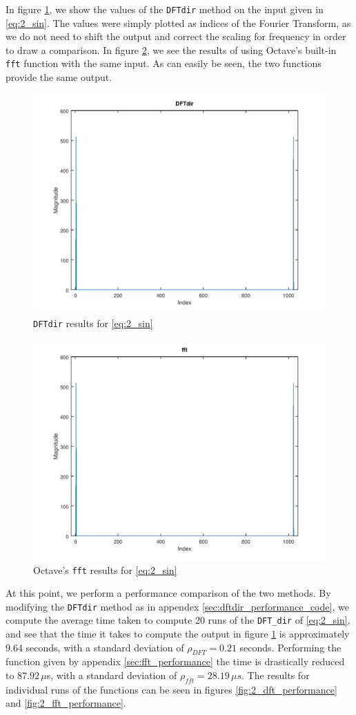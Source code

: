 \documentclass[a4paper, 12pt]{report}
\begin{document}
			In figure \ref{fig:2_dft}, we show the values of the \texttt{DFTdir} method on the input given in \eqref{eq:2_sin}. The values were simply plotted as indices of the Fourier Transform, as we do not need to shift the output and correct the scaling for frequency in order to draw a comparison. In figure \ref{fig:2_fft}, we see the results of using Octave's built-in \texttt{fft} function with the same input. As can easily be seen, the two functions provide the same output.

			\begin{figure}[H]
				\centering
				\includegraphics[width=.7\textwidth]{img/2_1.png}
				\caption{\texttt{DFTdir} results for \eqref{eq:2_sin}}
				\label{fig:2_dft}
			\end{figure}

			\begin{figure}[H]
				\centering
				\includegraphics[width=.7\textwidth]{img/2_2.png}
				\caption{Octave's \texttt{fft} results for \eqref{eq:2_sin}}
				\label{fig:2_fft}
			\end{figure}

			At this point, we perform a performance comparison of the two methods. By modifying the \texttt{DFTdir} method as in appendex \ref{sec:dftdir_performance_code}, we compute the average time taken to compute 20 runs of the \texttt{DFT\_dir} of \eqref{eq:2_sin}, and see that the time it takes to compute the output in figure \ref{fig:2_dft} is approximately 9.64 seconds, with a standard deviation of $\rho_{DFT} = 0.21$ seconds. Performing the function given by appendix \ref{sec:fft_performance} the time is drastically reduced to $87.92 \,\mu$s, with a standard deviation of $\rho_{fft} = 28.19 \,\mu s$. The results for individual runs of the functions can be seen in figures \ref{fig:2_dft_performance} and \ref{fig:2_fft_performance}.
\end{document}
